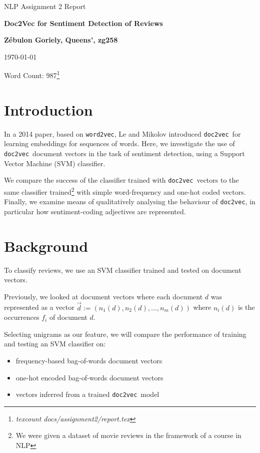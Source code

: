 \documentclass[12pt]{article}
\newcommand{\docvec}{\texttt{doc2vec}}
\newcommand{\wordvec}{\texttt{word2vec}}
\begin{document}
\centerline{\large NLP Assignment 2 Report}
\vspace{0.1in}
\centerline{\Large\bf Doc2Vec for Sentiment Detection of Reviews}
\vspace{0.1in}
\centerline{\large {\bf{Z\'ebulon Goriely, Queens', zg258}}}
\vspace{0.1in}
\centerline{\large {\today}}
\vspace{0.05in}
\centerline{Word Count: 987\footnote{\emph{texcount docs/assignment2/report.tex}}}
\vspace{0.2in}

\makeatletter
\newenvironment{tablehere}
  {\def\@captype{table}}
  {}

\newenvironment{figurehere}
  {\def\@captype{figure}}
  {}
\makeatother

\begin{multicols}{2}

\section{Introduction}

In a 2014 paper, based on \wordvec, Le and Mikolov \cite{le2014distributed} introduced \docvec~for learning embeddings for sequences of words. Here, we investigate the use of \docvec~document vectors in the task of sentiment detection, using a Support Vector Machine (SVM) classifier.

We compare the success of the classifier trained with \docvec~vectors to the same classifier trained\footnote{We were given a dataset of movie reviews in the framework of a course in NLP} with simple word-frequency and one-hot coded vectors. Finally, we examine means of qualitatively analysing the behaviour of \docvec, in particular how sentiment-coding adjectives are represented.

\section{Background}

To classify reviews, we use an SVM classifier trained and tested on document vectors.

Previously, we looked at document vectors where each document $d$ was represented as a vector $\vec{d} := (n_{1}(d), n_{2}(d),\ldots,n_{m}(d))$ where $n_{i}(d)$ is the occurrences $f_{i}$ of document $d$.

Selecting unigrams as our feature, we will compare the performance of training and testing an SVM classifier on:
\vspace{-\topsep}
\begin{itemize}
\setlength{\parskip}{0pt}
\setlength{\itemsep}{0pt plus 1pt}
	\item frequency-based bag-of-words document vectors
	\item one-hot encoded bag-of-words document vectors
	\item vectors inferred from a trained \docvec~model
\end{itemize}
\vspace{-\topsep}


\end{multicols}
\end{document}
